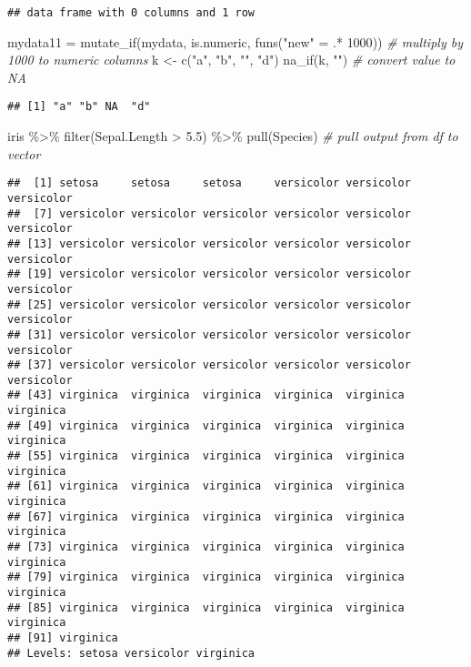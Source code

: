 \documentclass[
]{article}
\newenvironment{Shaded}{\begin{snugshade}}{\end{snugshade}}
\newcommand{\CommentTok}[1]{\textcolor[rgb]{0.56,0.35,0.01}{\textit{#1}}}
\newcommand{\DecValTok}[1]{\textcolor[rgb]{0.00,0.00,0.81}{#1}}
\newcommand{\FloatTok}[1]{\textcolor[rgb]{0.00,0.00,0.81}{#1}}
\newcommand{\FunctionTok}[1]{\textcolor[rgb]{0.00,0.00,0.00}{#1}}
\newcommand{\NormalTok}[1]{#1}
\newcommand{\OtherTok}[1]{\textcolor[rgb]{0.56,0.35,0.01}{#1}}
\newcommand{\SpecialCharTok}[1]{\textcolor[rgb]{0.00,0.00,0.00}{#1}}
\newcommand{\StringTok}[1]{\textcolor[rgb]{0.31,0.60,0.02}{#1}}
\begin{document}
\begin{verbatim}
## data frame with 0 columns and 1 row
\end{verbatim}

\begin{Shaded}
\begin{Highlighting}[]
\NormalTok{mydata11 }\OtherTok{=} \FunctionTok{mutate\_if}\NormalTok{(mydata, is.numeric, }\FunctionTok{funs}\NormalTok{(}\StringTok{"new"} \OtherTok{=}\NormalTok{ .}\SpecialCharTok{*} \DecValTok{1000}\NormalTok{)) }\CommentTok{\# multiply by 1000 to numeric columns}
\NormalTok{k }\OtherTok{\textless{}{-}} \FunctionTok{c}\NormalTok{(}\StringTok{"a"}\NormalTok{, }\StringTok{"b"}\NormalTok{, }\StringTok{""}\NormalTok{, }\StringTok{"d"}\NormalTok{)}
\FunctionTok{na\_if}\NormalTok{(k, }\StringTok{""}\NormalTok{) }\CommentTok{\# convert value to NA}
\end{Highlighting}
\end{Shaded}

\begin{verbatim}
## [1] "a" "b" NA  "d"
\end{verbatim}

\begin{Shaded}
\begin{Highlighting}[]
\NormalTok{iris }\SpecialCharTok{\%\textgreater{}\%} \FunctionTok{filter}\NormalTok{(Sepal.Length }\SpecialCharTok{\textgreater{}} \FloatTok{5.5}\NormalTok{) }\SpecialCharTok{\%\textgreater{}\%} \FunctionTok{pull}\NormalTok{(Species) }\CommentTok{\# pull output from df to vector}
\end{Highlighting}
\end{Shaded}

\begin{verbatim}
##  [1] setosa     setosa     setosa     versicolor versicolor versicolor
##  [7] versicolor versicolor versicolor versicolor versicolor versicolor
## [13] versicolor versicolor versicolor versicolor versicolor versicolor
## [19] versicolor versicolor versicolor versicolor versicolor versicolor
## [25] versicolor versicolor versicolor versicolor versicolor versicolor
## [31] versicolor versicolor versicolor versicolor versicolor versicolor
## [37] versicolor versicolor versicolor versicolor versicolor versicolor
## [43] virginica  virginica  virginica  virginica  virginica  virginica 
## [49] virginica  virginica  virginica  virginica  virginica  virginica 
## [55] virginica  virginica  virginica  virginica  virginica  virginica 
## [61] virginica  virginica  virginica  virginica  virginica  virginica 
## [67] virginica  virginica  virginica  virginica  virginica  virginica 
## [73] virginica  virginica  virginica  virginica  virginica  virginica 
## [79] virginica  virginica  virginica  virginica  virginica  virginica 
## [85] virginica  virginica  virginica  virginica  virginica  virginica 
## [91] virginica 
## Levels: setosa versicolor virginica
\end{verbatim}
\end{document}
